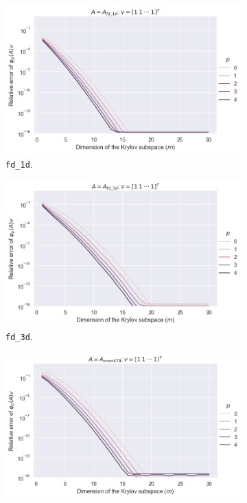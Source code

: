 \begin{figure}[h!]
    \centering
    \begin{subfigure}[b]{0.45\textwidth}
        \includegraphics[width=\textwidth]{img/krylovunivariate/fd_1d.png}
        \caption{\texttt{fd\_1d}.}
    \end{subfigure}
    \hfill
    \begin{subfigure}[b]{0.45\textwidth}
        \includegraphics[width=\textwidth]{img/krylovunivariate/fd_3d.png}
        \caption{\texttt{fd\_3d}.}
    \end{subfigure}
    \vfill
    \begin{subfigure}[b]{0.45\textwidth}
        \includegraphics[width=\textwidth]{img/krylovunivariate/orani678.png}

\end{subfigure}
\end{figure}
